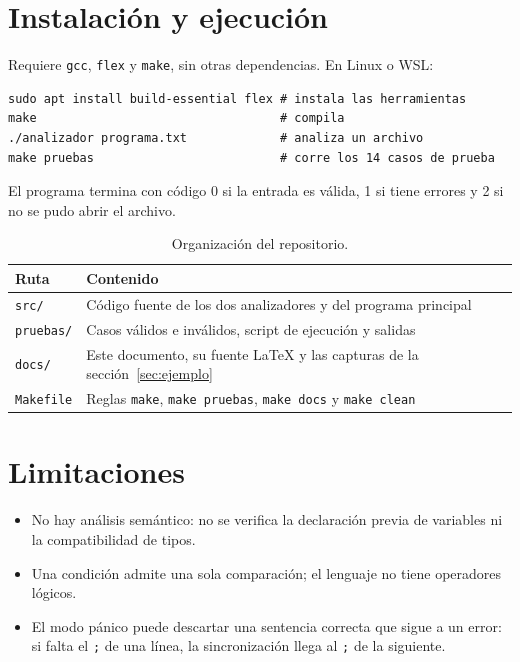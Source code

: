 \documentclass[12pt]{article}
\newcommand{\cmd}[1]{\texttt{\small #1}}
\begin{document}
\section{Instalación y ejecución}

Requiere \cmd{gcc}, \cmd{flex} y \cmd{make}, sin otras dependencias. En Linux o WSL:

\begin{lstlisting}
sudo apt install build-essential flex # instala las herramientas
make                                  # compila
./analizador programa.txt             # analiza un archivo
make pruebas                          # corre los 14 casos de prueba
\end{lstlisting}

El programa termina con código 0 si la entrada es válida, 1 si tiene errores y 2 si no se pudo
abrir el archivo.

\begin{table}[!htbp]
\centering\small
\begin{tabularx}{\textwidth}{@{}l X@{}}
\toprule
\textbf{Ruta} & \textbf{Contenido} \\
\midrule
\cmd{src/} & Código fuente de los dos analizadores y del programa principal \\
\cmd{pruebas/} & Casos válidos e inválidos, script de ejecución y salidas \\
\cmd{docs/} & Este documento, su fuente LaTeX y las capturas de la sección~\ref{sec:ejemplo} \\
\cmd{Makefile} & Reglas \cmd{make}, \cmd{make pruebas}, \cmd{make docs} y \cmd{make clean} \\
\bottomrule
\end{tabularx}
\caption{Organización del repositorio.}
\end{table}

\section{Limitaciones}

\begin{itemize}[leftmargin=1.1cm,itemsep=0.25em]
\item No hay análisis semántico: no se verifica la declaración previa de variables ni la
compatibilidad de tipos.
\item Una condición admite una sola comparación; el lenguaje no tiene operadores lógicos.
\item El modo pánico puede descartar una sentencia correcta que sigue a un error: si falta el
\cmd{;} de una línea, la sincronización llega al \cmd{;} de la siguiente.
\end{itemize}
\end{document}
